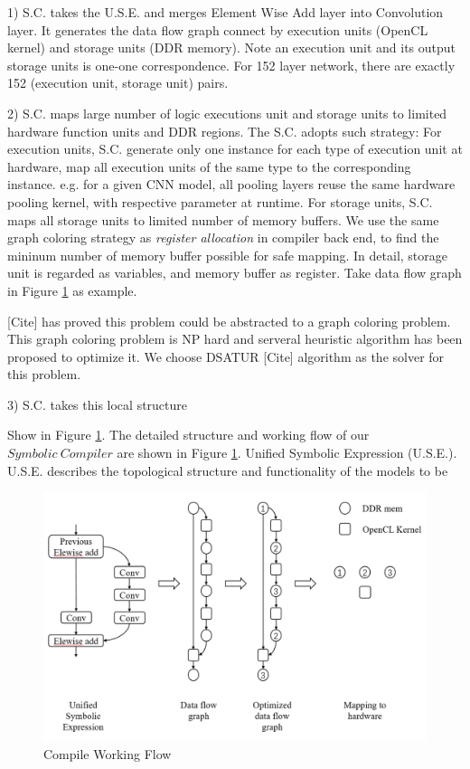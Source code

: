 \documentclass{acm_proc_article-sp-copy}
\begin{document}
1) S.C. takes the U.S.E. and merges Element Wise Add layer into Convolution layer. It generates the data flow graph connect by execution units (OpenCL kernel) and storage units (DDR memory). Note an execution unit and its output storage units is one-one correspondence. For 152 layer network, there are exactly 152 (execution unit, storage unit) pairs.

2) S.C. maps large number of logic executions unit and storage units to limited hardware function units and DDR regions. The S.C. adopts such strategy:
For execution units, S.C. generate only one instance for each type of execution unit at hardware, map all execution units of the same type to the corresponding instance. e.g. for a given CNN model, all pooling layers reuse the same hardware pooling kernel, with respective parameter at runtime.
For storage units, S.C. maps all storage units to limited number of memory buffers. We use the same graph coloring strategy as {\em register allocation} in compiler back end, to find the mininum number of memory buffer possible for safe mapping.
In detail, storage unit is regarded as variables, and memory buffer as register. Take data flow graph in Figure \ref{cflow} as example.

[Cite] has proved this problem could be abstracted to a graph coloring problem. This graph coloring problem is NP hard and serveral heuristic algorithm has been proposed to optimize it. We choose DSATUR [Cite] algorithm as the solver for this problem.

3) S.C. takes this local structure

Show in Figure \ref{cflow}.
The detailed structure and working flow of our $Symbolic\ Compiler$ are shown in Figure \ref{cflow}.
Unified Symbolic Expression (U.S.E.). U.S.E. describes the topological structure and functionality of the models to be

\begin{figure}
	\centering
	\includegraphics[width=1.0\linewidth]{./figure/z/compileflow.png}
	\caption{Compile Working Flow}
	\label{cflow}
\end{figure}
\end{document}
